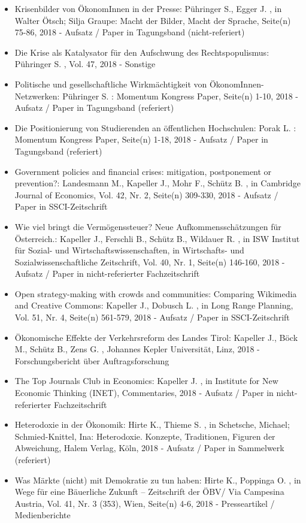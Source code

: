 \begin{itemize}
	 \item Krisenbilder von ÖkonomInnen in der Presse: Pühringer S., Egger J. , in Walter Ötsch; Silja Graupe: Macht der Bilder, Macht der Sprache, Seite(n) 75-86, 2018 - Aufsatz / Paper in Tagungsband (nicht-referiert)
	 \item Die Krise als Katalysator für den Aufschwung des Rechtspopulismus: Pühringer S. , Vol. 47, 2018 - Sonstige
	 \item Politische und gesellschaftliche Wirkmächtigkeit von ÖkonomInnen-Netzwerken: Pühringer S. : Momentum Kongress Paper, Seite(n) 1-10, 2018 - Aufsatz / Paper in Tagungsband (referiert)
	 \item Die Positionierung von Studierenden an öffentlichen Hochschulen: Porak L. : Momentum Kongress Paper, Seite(n) 1-18, 2018 - Aufsatz / Paper in Tagungsband (referiert)
	 \item Government policies and financial crises: mitigation, postponement or prevention?: Landesmann M., Kapeller J., Mohr F., Schütz B. , in Cambridge Journal of Economics, Vol. 42, Nr. 2, Seite(n) 309-330, 2018 - Aufsatz / Paper in SSCI-Zeitschrift
	 \item Wie viel bringt die Vermögenssteuer? Neue Aufkommensschätzungen für Österreich.: Kapeller J., Ferschli B., Schütz B., Wildauer R. , in ISW Institut für Sozial- und Wirtschaftswissenschaften, in Wirtschafts- und Sozialwissenschaftliche Zeitschrift, Vol. 40, Nr. 1, Seite(n) 146-160, 2018 - Aufsatz / Paper in nicht-referierter Fachzeitschrift
	 \item Open strategy-making with crowds and communities: Comparing Wikimedia and Creative Commons: Kapeller J., Dobusch L. , in Long Range Planning, Vol. 51, Nr. 4, Seite(n) 561-579, 2018 - Aufsatz / Paper in SSCI-Zeitschrift
	 \item Ökonomische Effekte der Verkehrsreform des Landes Tirol: Kapeller J., Böck M., Schütz B., Zens G. , Johannes Kepler Universität, Linz, 2018 - Forschungsbericht über Auftragsforschung
	 \item The Top Journals Club in Economics: Kapeller J. , in Institute for New Economic Thinking (INET), Commentaries, 2018 - Aufsatz / Paper in nicht-referierter Fachzeitschrift
	 \item Heterodoxie in der Ökonomik: Hirte K., Thieme S. , in Schetsche, Michael; Schmied-Knittel, Ina: Heterodoxie. Konzepte, Traditionen, Figuren der Abweichung, Halem Verlag, Köln, 2018 - Aufsatz / Paper in Sammelwerk (referiert)
	 \item Was Märkte (nicht) mit Demokratie zu tun haben: Hirte K., Poppinga O. , in Wege für eine Bäuerliche Zukunft – Zeitschrift der ÖBV/ Via Campesina Austria, Vol. 41, Nr. 3 (353), Wien, Seite(n) 4-6, 2018 - Presseartikel / Medienberichte

\end{itemize}
